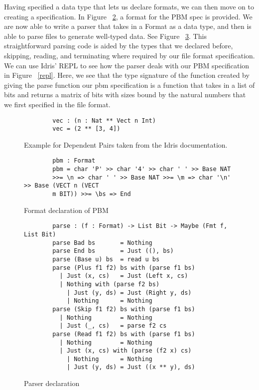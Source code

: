Having specified a data type that lets us declare formats, we can then move on
to creating a specification. In Figure
~\ref{spec_declaration}\footnotemark[\ref{idris_source}], a format for the PBM
spec is provided. We are now able to write a parser that takes in a Format as a
data type, and then is able to parse files to generate well-typed data. See
Figure ~\ref{parser}\footnotemark[\ref{idris_source}]. This straightforward
parsing code is aided by the types that we declared before, skipping, reading,
and terminating where required by our file format specification. We can use
Idris' REPL to see how the parser deals with our PBM specification in Figure
~\ref{repl}\footnotemark[\ref{idris_source}]. Here, we see that the type
signature of the function created by giving the parse function our pbm
specification is a function that takes in a list of bits and returns a matrix of
bits with sizes bound by the natural numbers that we first specified in the file
format. 

\begin{figure}[h]
    \caption{Example for Dependent Pairs taken from the Idris documentation.}
    \label{dependentPairExample}
    \begin{lstlisting}
        vec : (n : Nat ** Vect n Int)
        vec = (2 ** [3, 4])
    \end{lstlisting}
\end{figure}

\begin{figure}[h]
    \caption{Format declaration of PBM \protect\cite{power_of_pi}}
    \label{spec_declaration}
    \begin{lstlisting}
        pbm : Format 
        pbm = char 'P' >> char '4' >> char ' ' >> Base NAT
        >>= \n => char ' ' >> Base NAT >>= \m => char '\n' >> Base (VECT n (VECT
        m BIT)) >>= \bs => End
    \end{lstlisting}
\end{figure}


\begin{figure}[ht!!!!!]
    \caption{Parser declaration \protect\cite{power_of_pi}}
    \label{parser}
    \begin{lstlisting}
        parse : (f : Format) -> List Bit -> Maybe (Fmt f, List Bit)
        parse Bad bs       = Nothing
        parse End bs       = Just ((), bs)
        parse (Base u) bs  = read u bs
        parse (Plus f1 f2) bs with (parse f1 bs)
          | Just (x, cs)   = Just (Left x, cs)
          | Nothing with (parse f2 bs)
            | Just (y, ds) = Just (Right y, ds)
            | Nothing      = Nothing
        parse (Skip f1 f2) bs with (parse f1 bs)
          | Nothing        = Nothing
          | Just (_, cs)   = parse f2 cs
        parse (Read f1 f2) bs with (parse f1 bs)
          | Nothing        = Nothing
          | Just (x, cs) with (parse (f2 x) cs)
            | Nothing      = Nothing
            | Just (y, ds) = Just ((x ** y), ds)
    \end{lstlisting}
\end{figure}

